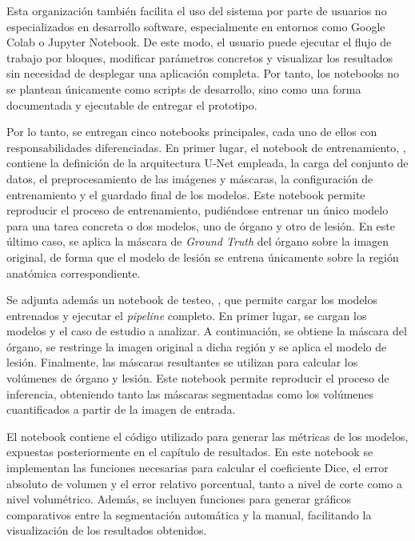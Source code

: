 Esta organización también facilita el uso del sistema por parte de usuarios no especializados en desarrollo software, especialmente en entornos como Google Colab o Jupyter Notebook. De este modo, el usuario puede ejecutar el flujo de trabajo por bloques, modificar parámetros concretos y visualizar los resultados sin necesidad de desplegar una aplicación completa. Por tanto, los notebooks no se plantean únicamente como scripts de desarrollo, sino como una forma documentada y ejecutable de entregar el prototipo.

Por lo tanto, se entregan cinco notebooks principales, cada uno de ellos con responsabilidades diferenciadas. En primer lugar, el notebook de entrenamiento, , contiene la definición de la arquitectura U-Net empleada, la carga del conjunto de datos, el preprocesamiento de las imágenes y máscaras, la configuración de entrenamiento y el guardado final de los modelos. Este notebook permite reproducir el proceso de entrenamiento, pudiéndose entrenar un único modelo para una tarea concreta o dos modelos, uno de órgano y otro de lesión. En este último caso, se aplica la máscara de \textit{Ground Truth} del órgano sobre la imagen original, de forma que el modelo de lesión se entrena únicamente sobre la región anatómica correspondiente.

Se adjunta además un notebook de testeo, , que permite cargar los modelos entrenados y ejecutar el \textit{pipeline} completo. En primer lugar, se cargan los modelos y el caso de estudio a analizar. A continuación, se obtiene la máscara del órgano, se restringe la imagen original a dicha región y se aplica el modelo de lesión. Finalmente, las máscaras resultantes se utilizan para calcular los volúmenes de órgano y lesión. Este notebook permite reproducir el proceso de inferencia, obteniendo tanto las máscaras segmentadas como los volúmenes cuantificados a partir de la imagen de entrada.

El notebook  contiene el código utilizado para generar las métricas de los modelos, expuestas posteriormente en el capítulo de resultados. En este notebook se implementan las funciones necesarias para calcular el coeficiente Dice, el error absoluto de volumen y el error relativo porcentual, tanto a nivel de corte como a nivel volumétrico. Además, se incluyen funciones para generar gráficos comparativos entre la segmentación automática y la manual, facilitando la visualización de los resultados obtenidos.

